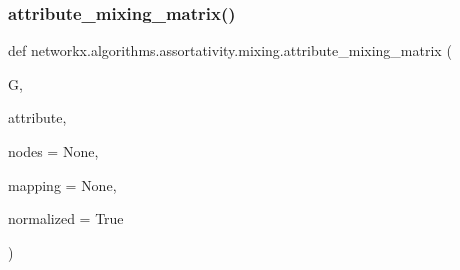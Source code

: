 \subsubsection{\texorpdfstring{attribute\+\_\+mixing\+\_\+matrix()}{attribute\_mixing\_matrix()}}
{\footnotesize\ttfamily def networkx.\+algorithms.\+assortativity.\+mixing.\+attribute\+\_\+mixing\+\_\+matrix (\begin{DoxyParamCaption}\item[{}]{G,  }\item[{}]{attribute,  }\item[{}]{nodes = {\ttfamily None},  }\item[{}]{mapping = {\ttfamily None},  }\item[{}]{normalized = {\ttfamily True} }\end{DoxyParamCaption})}

